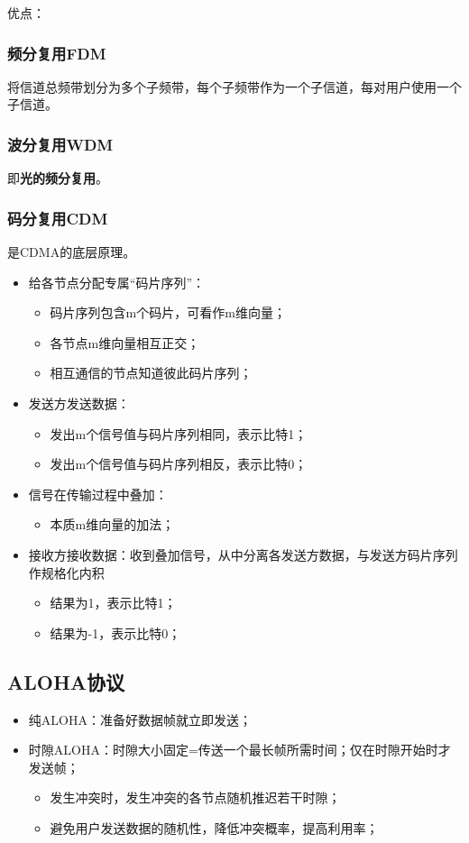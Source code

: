 优点：


\subsubsection{频分复用FDM}
将信道总频带划分为多个子频带，每个子频带作为一个子信道，每对用户使用一个子信道。


\subsubsection{波分复用WDM}
即\textbf{光的频分复用}。


\subsubsection{码分复用CDM}
是CDMA的底层原理。

\begin{itemize}
    \item 给各节点分配专属“码片序列”：\begin{itemize}
        \item 码片序列包含m个码片，可看作m维向量；
        \item 各节点m维向量相互正交；
        \item 相互通信的节点知道彼此码片序列；
    \end{itemize}
    \item 发送方发送数据：\begin{itemize}
        \item 发出m个信号值与码片序列相同，表示比特1；
        \item 发出m个信号值与码片序列相反，表示比特0；
    \end{itemize}
    \item 信号在传输过程中叠加：\begin{itemize}
        \item 本质m维向量的加法；
    \end{itemize}
    \item 接收方接收数据：收到叠加信号，从中分离各发送方数据，与发送方码片序列作规格化内积\begin{itemize}
        \item 结果为1，表示比特1；
        \item 结果为-1，表示比特0；
    \end{itemize}
\end{itemize}


\subsection{ALOHA协议}
\begin{itemize}
    \item 纯ALOHA：准备好数据帧就立即发送；
    \item 时隙ALOHA：时隙大小固定=传送一个最长帧所需时间；仅在时隙开始时才发送帧；\begin{itemize}
        \item 发生冲突时，发生冲突的各节点随机推迟若干时隙；
        \item 避免用户发送数据的随机性，降低冲突概率，提高利用率；
    \end{itemize}
\end{itemize}


